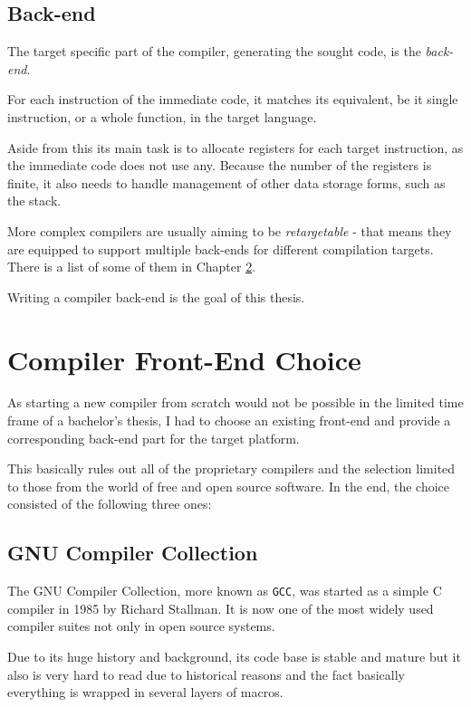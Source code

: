     \section{Back-end}\label{desc_backend}

        The target specific part of the compiler, generating the sought code, is the \emph{back-end}.

        For each instruction of the immediate code, it matches its equivalent, be it single instruction, or a whole function, in the target language.

        Aside from this its main task is to allocate registers for each target instruction, as the immediate code does not use any. Because the number of the registers is finite, it also needs to handle management of other data storage forms, such as the stack.\cite{DragonBook}

        More complex compilers are usually aiming to be \emph{retargetable} - that means they are equipped to support multiple back-ends for different compilation targets. There is a list of some of them in Chapter \ref{compiler}.

        Writing a compiler back-end is the goal of this thesis.

\chapter{Compiler Front-End Choice}\label{compiler}

As starting a new compiler from scratch would not be possible in the limited time frame of a bachelor's thesis, I had to choose an existing front-end and provide a corresponding back-end part for the target platform.

This basically rules out all of the proprietary compilers and the selection limited to those from the world of free and open source software. In the end, the choice consisted of the following three ones:

    \section{GNU Compiler Collection}\label{gcc}

    The GNU Compiler Collection, more known as \texttt{GCC}, was started as a simple C compiler in 1985 by Richard Stallman. It is now one of the most widely used compiler suites not only in open source systems.\cite{GccWeb}

    Due to its huge history and background, its code base is stable and mature but it also is very hard to read due to historical reasons and the fact basically everything is wrapped in several layers of macros.

